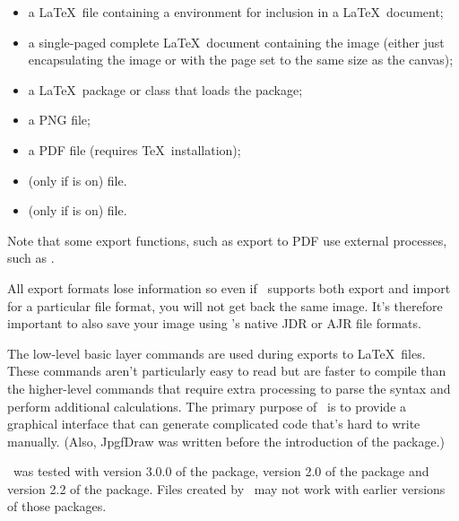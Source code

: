 \begin{itemize}
    \item a \LaTeX\ file containing a  environment
    for inclusion in a \LaTeX\ document;

    \item a single-paged complete \LaTeX\ document containing the image
    (either just encapsulating the image or with the page set to the
    same size as the \gls{canvas});

    \item a \LaTeX\ package or class that loads the  package;

    \item a PNG file;

    \item a PDF file (requires \TeX\ installation);

    \item (only if  is on)
      file.

    \item (only if  is on)
      file.
\end{itemize}

Note that some export functions, such as export to PDF use external
processes, such as .

\begin{important}
All export formats lose information so even if \FlowframTk\ supports
both export and import for a particular file format, you will not
get back the same image. It's therefore important to also save your
image using \FlowframTk's native \gls{JDR} or \gls{AJR} file
formats.
\end{important}

The low-level  basic layer commands are used during
exports to \LaTeX\ files. These commands aren't particularly easy to
read but are faster to compile than the higher-level commands that
require extra processing to parse the syntax and perform additional
calculations. The primary purpose of \FlowframTk\ is to provide a
graphical interface that can generate complicated code that's hard
to write manually. (Also, \gls{JpgfDraw} was written before the
introduction of the  package.)

\FlowframTk\ was tested with version 3.0.0 of the 
package, version 2.0 of the  package and version
2.2 of the  package. Files created by \FlowframTk\
may not work with earlier versions of those packages.

